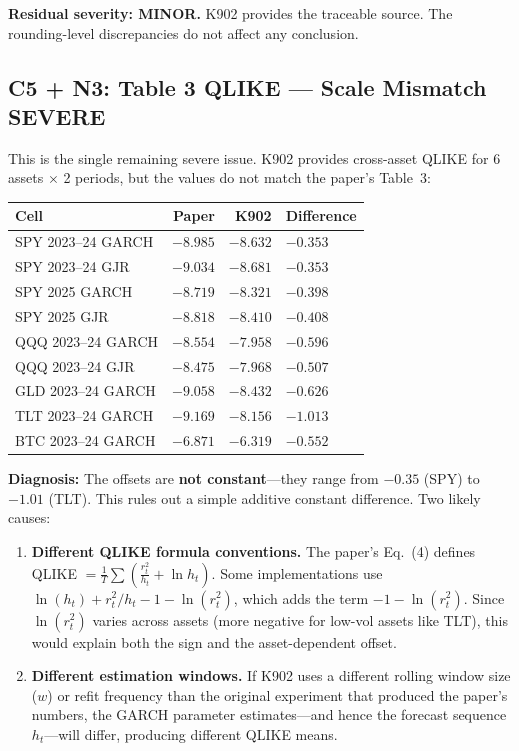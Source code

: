 \documentclass[12pt,a4paper]{article}
\begin{document}
\textbf{Residual severity: MINOR.} K902 provides the traceable source. The rounding-level discrepancies do not affect any conclusion.


\subsection*{C5 + N3: Table 3 QLIKE --- Scale Mismatch \hfill \textcolor{errorred}{SEVERE}}

This is the single remaining severe issue. K902 provides cross-asset QLIKE for 6 assets $\times$ 2 periods, but the values do not match the paper's Table~3:

\medskip
\begin{tabular}{lrrl}
\toprule
\textbf{Cell} & \textbf{Paper} & \textbf{K902} & \textbf{Difference} \\
\midrule
SPY 2023--24 GARCH & $-8.985$ & $-8.632$ & $-0.353$ \\
SPY 2023--24 GJR   & $-9.034$ & $-8.681$ & $-0.353$ \\
SPY 2025 GARCH     & $-8.719$ & $-8.321$ & $-0.398$ \\
SPY 2025 GJR       & $-8.818$ & $-8.410$ & $-0.408$ \\
QQQ 2023--24 GARCH & $-8.554$ & $-7.958$ & $-0.596$ \\
QQQ 2023--24 GJR   & $-8.475$ & $-7.968$ & $-0.507$ \\
GLD 2023--24 GARCH & $-9.058$ & $-8.432$ & $-0.626$ \\
TLT 2023--24 GARCH & $-9.169$ & $-8.156$ & $-1.013$ \\
BTC 2023--24 GARCH & $-6.871$ & $-6.319$ & $-0.552$ \\
\bottomrule
\end{tabular}

\medskip
\noindent\textbf{Diagnosis:} The offsets are \textbf{not constant}---they range from $-0.35$ (SPY) to $-1.01$ (TLT). This rules out a simple additive constant difference. Two likely causes:
\begin{enumerate}[nosep]
\item \textbf{Different QLIKE formula conventions.} The paper's Eq.~(4) defines QLIKE $= \frac{1}{T}\sum(\frac{r^2_t}{h_t} + \ln h_t)$. Some implementations use $\ln(h_t) + r^2_t/h_t - 1 - \ln(r^2_t)$, which adds the term $-1 - \ln(r^2_t)$. Since $\ln(r^2_t)$ varies across assets (more negative for low-vol assets like TLT), this would explain both the sign and the asset-dependent offset.
\item \textbf{Different estimation windows.} If K902 uses a different rolling window size ($w$) or refit frequency than the original experiment that produced the paper's numbers, the GARCH parameter estimates---and hence the forecast sequence $h_t$---will differ, producing different QLIKE means.
\end{enumerate}
\end{document}
